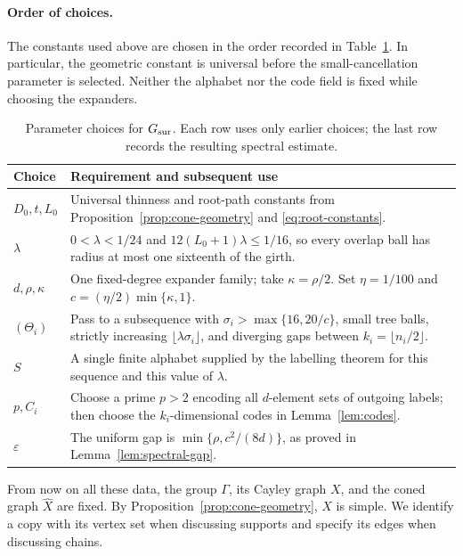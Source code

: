 \paragraph{Order of choices.}
The constants used above are chosen in the order recorded in
Table~\ref{tab:parameters}. In particular, the geometric constant is
universal before the small-cancellation parameter is selected. Neither
the alphabet nor the code field is fixed while choosing the expanders.

\begin{table}[ht]
\centering
\small
\begin{tabularx}{\linewidth}{@{}lX@{}}
\toprule
Choice & Requirement and subsequent use \\
\midrule
$D_0,t,L_0$ & Universal thinness and root-path constants from
Proposition~\ref{prop:cone-geometry} and \eqref{eq:root-constants}.\\
$\lambda$ & $0<\lambda<1/24$ and
$12(L_0+1)\lambda\le1/16$, so every overlap ball has radius at most
one sixteenth of the girth.\\
$d,\rho,\kappa$ & One fixed-degree expander family; take
$\kappa=\rho/2$. Set $\eta=1/100$ and
$c=(\eta/2)\min\{\kappa,1\}$.\\
$(\Theta_i)$ & Pass to a subsequence with
$\sigma_i>\max\{16,20/c\}$, small tree balls, strictly increasing
$\lfloor\lambda\sigma_i\rfloor$, and diverging gaps between
$k_i=\lfloor n_i/2\rfloor$.\\
$S$ & A single finite alphabet supplied by the labelling theorem for
this sequence and this value of $\lambda$.\\
$p,C_i$ & Choose a prime $p>2$ encoding all $d$-element sets of outgoing labels;
then choose the $k_i$-dimensional codes in Lemma~\ref{lem:codes}.\\
$\varepsilon$ & The uniform gap is
$\min\{\rho,c^2/(8d)\}$, as proved in
Lemma~\ref{lem:spectral-gap}.\\
\bottomrule
\end{tabularx}
\caption{Parameter choices for $G_{\mathrm{sur}}$. Each row uses only earlier
choices; the last row records the resulting spectral estimate.}
\label{tab:parameters}
\end{table}

From now on all these data, the group \(\Gamma\), its Cayley graph
\(X\), and the coned graph \(\widehat X\) are fixed. By
Proposition~\ref{prop:cone-geometry}, \(X\) is simple. We identify a copy
with its vertex set when discussing supports and specify its edges when
discussing chains.

